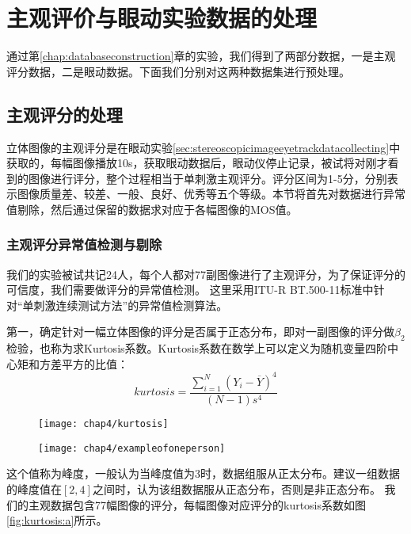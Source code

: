 \chapter{主观评价与眼动实验数据的处理}
\label{chap:dataprocess}
通过第\ref{chap:databaseconstruction}章的实验，我们得到了两部分数据，一是主观评分数据，二是眼动数据。下面我们分别对这两种数据集进行预处理。

\section{主观评分的处理}
\label{sec:subjectscore}
立体图像的主观评分是在眼动实验\ref{sec:stereoscopicimageeyetrackdatacollecting}中获取的，每幅图像播放10s，获取眼动数据后，眼动仪停止记录，被试将对刚才看到的图像进行评分，整个过程相当于单刺激主观评分。评分区间为1-5分，分别表示图像质量差、较差、一般、良好、优秀等五个等级。本节将首先对数据进行异常值剔除，然后通过保留的数据求对应于各幅图像的MOS值。
\subsection{主观评分异常值检测与剔除}
\label{sec:dropsinglesubjecterrorvalue}
我们的实验被试共记24人，每个人都对77副图像进行了主观评分，为了保证评分的可信度，我们需要做评分的异常值检测。
这里采用ITU-R BT.500-11\parencite{recommendation2002500}标准中针对“单刺激连续测试方法”的异常值检测算法。

第一，确定针对一幅立体图像的评分是否属于正态分布，即对一副图像的评分做${\beta _2}$检验，也称为求Kurtosis系数\parencite{goldmann2010comprehensive}。Kurtosis系数在数学上可以定义为随机变量四阶中心矩和方差平方的比值：
\begin{equation}
kurtosis = \frac{{\sum\nolimits_{i = 1}^N {{{({Y_i} - \overline Y )}^4}} }}{{(N - 1){s^4}}}
\end{equation}
\begin{figure}[htbp]
  \centering
  \begin{minipage}[b]{0.73\textwidth}
    \captionstyle{\centering}
    \centering
    \texttt{[image: chap4/kurtosis]}
  \end{minipage} %
  \hfill
  \begin{minipage}[b]{0.74\textwidth}
    \captionstyle{\centering}
    \centering
    \texttt{[image: chap4/exampleofoneperson]}
  \end{minipage}     
\end{figure}
这个值称为峰度，一般认为当峰度值为3时，数据组服从正太分布。\parencite{recommendation2002500}建议一组数据的峰度值在$[2,4]$之间时，认为该组数据服从正态分布，否则是非正态分布。
我们的主观数据包含77幅图像的评分，每幅图像对应评分的kurtosis系数如图\ref{fig:kurtosis:a}所示。

